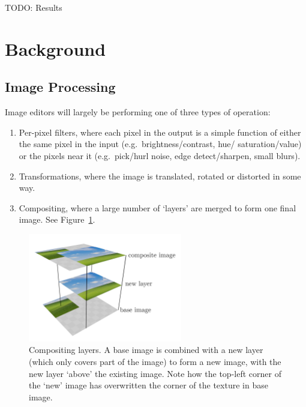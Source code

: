 \documentclass[12pt]{article}
\begin{document}
TODO: Results



\pagebreak

\section{Background}

\subsection{Image Processing}

Image editors will largely be performing one of three types of operation:

\begin{enumerate}
    \item Per-pixel filters, where each pixel in the output is a simple function of either the same
        pixel in the input (e.g.\ brightness/contrast, hue/ saturation/value) or the pixels near it
        (e.g.\ pick/hurl noise, edge detect/sharpen, small blurs).
    \item Transformations, where the image is translated, rotated or distorted in some way.
    \item Compositing, where a large number of `layers' are merged to form one final image.  See
        Figure~\ref{fig:compositing}.
\end{enumerate}

\begin{figure}
    \begin{center}
        \includegraphics[width=0.6\textwidth]{compositing}
    \end{center}
    \caption{Compositing layers.  A base image is combined with a new layer (which only covers part
    of the image) to form a new image, with the new layer `above' the existing image.  Note how the
    top-left corner of the `new' image has overwritten the corner of the texture in base
    image.}\label{fig:compositing}
\end{figure}
\end{document}
